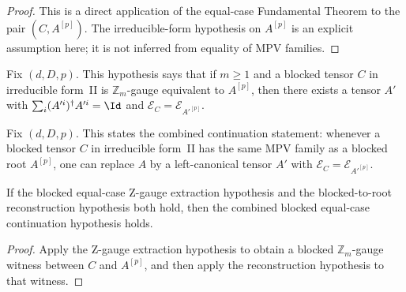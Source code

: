 \begin{proof}\leanok
    This is a direct application of the equal-case Fundamental Theorem to the
    pair $(C,A^{[p]})$. The irreducible-form hypothesis on $A^{[p]}$ is an
    explicit assumption here; it is not inferred from equality of MPV families.
\end{proof}

\begin{definition}
    \label{def:peripheral_equalcase_root_from_zgauge}
    \leanok
    Fix $(d,D,p)$. This hypothesis says that if $m \ge 1$ and a blocked tensor
    $C$ in irreducible form~II is $\mathbb Z_m$-gauge equivalent to $A^{[p]}$,
    then there exists a tensor $A'$ with
    $\sum_i (A'^i)^\dagger A'^i = \Id$ and
    $\mathcal E_C = \mathcal E_{A'^{[p]}}$.
\end{definition}

\begin{definition}
    \label{def:peripheral_equalcase_periodicFT_sameMPV}
    \leanok
    Fix $(d,D,p)$. This states the combined continuation statement: whenever a
    blocked tensor $C$ in irreducible form~II has the same MPV family as a
    blocked root $A^{[p]}$, one can replace $A$ by a left-canonical tensor $A'$
    with $\mathcal E_C = \mathcal E_{A'^{[p]}}$.
\end{definition}

\begin{theorem}
    \label{thm:peripheral_equalcase_sameMPV_zgauge_reduction}
    \leanok
    If the blocked equal-case Z-gauge extraction hypothesis and the
    blocked-to-root reconstruction hypothesis both hold, then the combined
    blocked equal-case continuation hypothesis holds.
\end{theorem}

\begin{proof}\leanok
    Apply the Z-gauge extraction hypothesis to obtain a blocked
    $\mathbb Z_m$-gauge witness between $C$ and $A^{[p]}$, and then apply the
    reconstruction hypothesis to that witness.
\end{proof}

